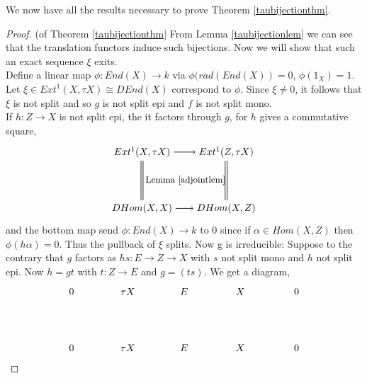 \documentclass[11.5pt, twoside, a4paper, titlepage]{report}
\theoremstyle{definition}
\theoremstyle{plain}
\begin{document}
We now have all the results necessary to prove Theorem \ref{taubijectionthm}.
\begin{proof} (of Theorem \ref{taubijectionthm}
From Lemma \ref{taubijectionlem} we can see that the translation functors induce such bijections. Now we will show that such an exact sequence $\xi$ exits.\\
Define a linear map $\phi: End(X) \to k$ via $\phi(rad(End(X))=0$, $\phi(1_X)=1$. Let $\xi\in Ext^1(X, \tau X)\cong DEnd(X)$ correspond to $\phi$. Since $\xi\neq 0$, it follows that $\xi$ is not split and so $g$ is not split epi and $f$ is not split mono.\\
If $h: Z \to X$ is not split epi, the it factors through $g$, for $h$ gives a commutative square,
 \begin{equation*}
\begin{tikzpicture}[->,-latex, auto, main path/.style={->, semithick}, main node/.style={}]
\node [main node]		(1) at (0,0)		{$Ext^1(X, \tau X)$};
\node	[main node]		(2) at (3,0)		{$Ext^1(Z, \tau X)$};
\node	[main node]		(3) at (0,-2)		{$DHom(X,X)$};
\node [main node]		(4) at (3,-2)		{$DHom(X,Z)$};

\draw (1) edge [main path] node [auto] {$$} (2);
\draw (3) edge [main path]  (4);
\draw (1) edge [-, double, semithick, double distance=1.5pt] node [auto] {\small{Lemma \ref{adjointlem}}} (3);
\draw (2) edge [-, double, semithick, double distance=1.5pt] (4);
\end{tikzpicture}
\end{equation*}
and the bottom map send $\phi: End(X) \to k$ to $0$ since if $\alpha \in Hom(X,Z)$ then $\phi(h\alpha)=0$. Thus the pullback of $\xi$ splits.
Now g is irreducible: Suppose to the contrary that $g$ factors as $hs: E \to Z \to X$ with $s$ not split mono and $h$ not split epi.  Now $h=gt$ with $t: Z \to E$ and $g=(ts)$. We get a diagram, 
\begin{equation*}
\begin{tikzpicture}[->,-latex, auto, main path/.style={->, semithick}, main node/.style={}]
\node	[main node]		(2) at (2,0)		{$0$};
\node	[main node]		(3) at (4,0)		{$\tau X$};
\node [main node]		(4) at (6,0)		{$E$};
\node [main node]		(5) at (8,0)		{$X$};
\node	[main node]		(11) at (10,0)	{$0$};

\node	[main node]		(7) at (2,-2)		{$0$};
\node	[main node]		(8) at (4,-2)		{$\tau X$};
\node [main node]		(9) at (6,-2)		{$E$};
\node [main node]		(10) at (8,-2)	{$X$};
\node [main node]		(13) at (10,-2)	{$0$};


\end{tikzpicture}
\end{equation*}
\end{proof}
\end{document}
